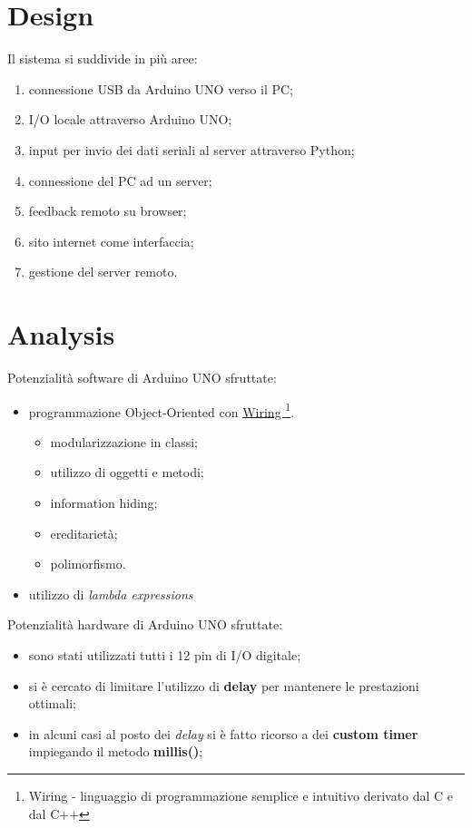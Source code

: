 \section{Design}
Il sistema si suddivide in più aree:
\begin{enumerate}
	\item connessione USB da Arduino UNO verso il PC;
	\item I/O locale attraverso Arduino UNO;
	\item input per invio dei dati seriali al server attraverso Python;
	\item connessione del PC ad un server;
	\item feedback remoto su browser;
	\item sito internet come interfaccia;
	\item gestione del server remoto.
\end{enumerate}

\section{Analysis}
Potenzialità software di Arduino UNO sfruttate:
\begin{itemize}
	\item programmazione Object-Oriented con \href{https://it.wikipedia.org/wiki/Wiring}{Wiring \footnote{Wiring - linguaggio di programmazione semplice e intuitivo derivato dal C e dal C++}}.
	\begin{itemize}
		\item modularizzazione in classi;
		\item utilizzo di oggetti e metodi;
		\item information hiding;
		\item ereditarietà;
		\item polimorfismo.
	\end{itemize}
	\item utilizzo di \textit{lambda expressions}
\end{itemize}
Potenzialità hardware di Arduino UNO sfruttate:
\begin{itemize}
	\item sono stati utilizzati tutti i 12 pin di I/O digitale;
	\item si è cercato di limitare l'utilizzo di \textbf{delay} per mantenere le prestazioni ottimali;
	\item in alcuni casi al posto dei \textit{delay} si è fatto ricorso a dei \textbf{custom timer} impiegando il metodo \textbf{millis()};
\end{itemize}